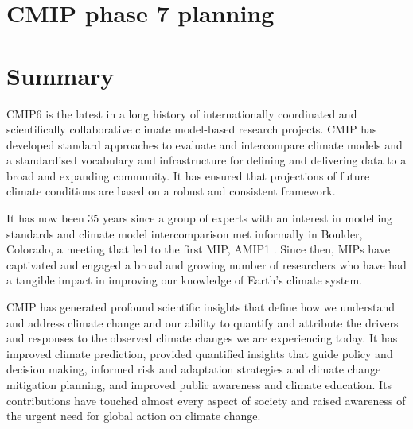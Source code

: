 \documentclass[manuscript]{copernicus}
\newcommand{\mycomment}[1]{}
\def\cred#1{{\color{red}#1}}
\begin{document}
\mycomment{
MIP6Plus: Infrastructure concepts of multiverse/CMIP, planet/project, and continent/usernodes)
}





\section{CMIP phase 7 planning}
\label{sec:CMIP7Planning}
\cred{\cite{mizielinski_cmip6_2025, juckes_baseline_2025, hassell_essential_2025, dunne_evolving_2024-1, hoffman_rapid_2025, durack_earth_2025, ruane_cmip7_2025, li_cmip7_2025,mcpartland_cmip7_2025,dingley_cmip7_2025,fox-kemper_cmip7_2025}}

\cred{\cite{gillett_detection_2025, roberts_high-resolution_2025}}





\section{Summary} %
\label{sec:Summary}

CMIP6 is the latest in a long history of internationally coordinated and scientifically collaborative climate model-based research projects. CMIP has developed standard approaches to evaluate and intercompare climate models and a standardised vocabulary and infrastructure for defining and delivering data to a broad and expanding community. It has ensured that projections of future climate conditions are based on a robust and consistent framework.

It has now been 35 years since a group of experts with an interest in modelling standards and climate model intercomparison met informally in Boulder, Colorado, a meeting that led to the first MIP, AMIP1 \citep{gates_amip_1991}. Since then, MIPs have captivated and engaged a broad and growing number of researchers who have had a tangible impact in improving our knowledge of Earth's climate system.

CMIP has generated profound scientific insights that define how we understand and address climate change and our ability to quantify and attribute the drivers and responses to the observed climate changes we are experiencing today. It has improved climate prediction, provided quantified insights that guide policy and decision making, informed risk and adaptation strategies and climate change mitigation planning, and improved public awareness and climate education. Its contributions have touched almost every aspect of society and raised awareness of the urgent need for global action on climate change.
\end{document}
